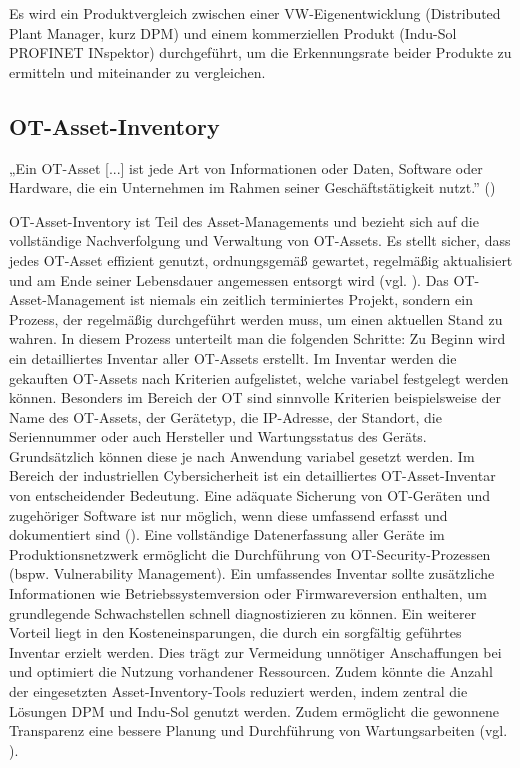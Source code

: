\clearpage \noindent Es wird ein Produktvergleich zwischen einer VW-Eigenentwicklung (Distributed Plant Manager, kurz DPM) und einem kommerziellen Produkt (Indu-Sol PROFINET INspektor) durchgeführt, um die Erkennungsrate beider Produkte zu ermitteln und miteinander zu vergleichen. 



\subsection{OT-Asset-Inventory}

  „Ein OT-Asset [...] ist jede Art von Informationen oder Daten, Software oder Hardware, die ein Unternehmen im Rahmen seiner Geschäftstätigkeit nutzt.'' (\cite{IBM})

OT-Asset-Inventory ist Teil des Asset-Managements und bezieht sich auf die vollständige Nachverfolgung und Verwaltung von OT-Assets. Es stellt sicher, dass jedes OT-Asset effizient genutzt, ordnungsgemäß gewartet, regelmäßig aktualisiert und am Ende seiner Lebensdauer angemessen entsorgt wird (vgl. \cite{IBM}). Das OT-Asset-Management ist niemals ein zeitlich terminiertes Projekt, sondern ein Prozess, der regelmäßig durchgeführt werden muss, um einen aktuellen Stand zu wahren. In diesem Prozess unterteilt man die folgenden Schritte: Zu Beginn wird ein detailliertes Inventar aller OT-Assets erstellt. Im Inventar werden die gekauften OT-Assets nach Kriterien aufgelistet, welche variabel festgelegt werden können. Besonders im Bereich der OT sind sinnvolle Kriterien beispielsweise der Name des OT-Assets, der Gerätetyp, die IP-Adresse, der Standort, die Seriennummer oder auch Hersteller und Wartungsstatus des Geräts. Grundsätzlich können diese je nach Anwendung variabel gesetzt werden. Im Bereich der industriellen Cybersicherheit ist ein detailliertes OT-Asset-Inventar von entscheidender Bedeutung. Eine adäquate Sicherung von OT-Geräten und zugehöriger Software ist nur möglich, wenn diese umfassend erfasst und dokumentiert sind (\cite{atlassian}). Eine vollständige Datenerfassung aller Geräte im Produktionsnetzwerk ermöglicht die Durchführung von OT-Security-Prozessen (bspw. Vulnerability Management). Ein umfassendes Inventar sollte zusätzliche Informationen wie  Betriebssystemversion oder Firmwareversion enthalten, um grundlegende Schwachstellen schnell diagnostizieren zu können. Ein weiterer Vorteil liegt in den Kosteneinsparungen, die durch ein sorgfältig geführtes Inventar erzielt werden. Dies trägt zur Vermeidung unnötiger Anschaffungen bei und optimiert die Nutzung vorhandener Ressourcen. Zudem könnte die Anzahl der eingesetzten Asset-Inventory-Tools reduziert werden, indem zentral die Lösungen DPM und Indu-Sol genutzt werden. Zudem ermöglicht die gewonnene Transparenz eine bessere Planung und Durchführung von Wartungsarbeiten (vgl. \cite{sichereIndustrie}).
\clearpage

